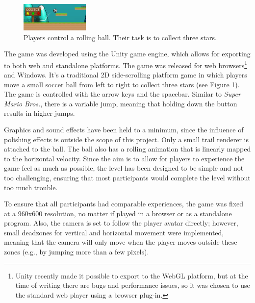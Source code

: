 \begin{figure}[htbp]
\centering
\includegraphics[width=0.3\textwidth]{Pics/gf}
\caption{Players control a rolling ball. Their task is to collect three stars.}
\label{fig:game}
\end{figure}

The game was developed using the Unity game engine, which allows for exporting to both web and standalone platforms. The game was released for web browsers\footnote{Unity recently made it possible to export to the WebGL platform, but at the time of writing there are bugs and performance issues, so it was chosen to use the standard web player using a browser plug-in.} and Windows. It's a traditional 2D side-scrolling platform game in which players move a small soccer ball from left to right to collect three stars (see Figure \ref{fig:game}). The game is controlled with the arrow keys and the spacebar. Similar to \textit{Super Mario Bros.}, there is a variable jump, meaning that holding down the button results in higher jumps.

Graphics and sound effects have been held to a minimum, since the influence of polishing effects is outside the scope of this project. Only a small trail renderer is attached to the ball. The ball also has a rolling animation that is linearly mapped to the horizontal velocity. Since the aim is to allow for players to experience the game feel as much as possible, the level has been designed to be simple and not too challenging, ensuring that most participants would complete the level without too much trouble.

To ensure that all participants had comparable experiences, the game was fixed at a 960x600 resolution, no matter if played in a browser or as a standalone program. Also, the camera is set to follow the player avatar directly; however, small deadzones for vertical and horizontal movement were implemented, meaning that the camera will only move when the player moves outside these zones (e.g., by jumping more than a few pixels).